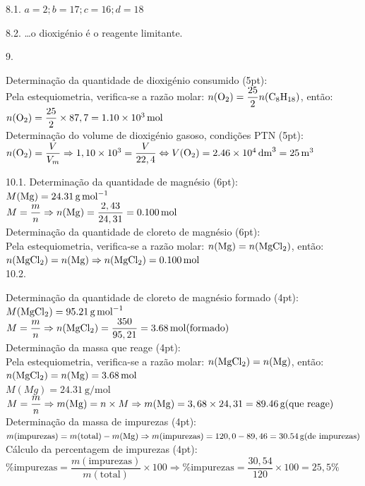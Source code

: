 \documentclass{article}
\begin{document}
\vspace{20pt}
8.1. $a = 2; b = 17; c = 16; d = 18$ 

\vspace{20pt}
8.2. \ldots o dioxigénio é o reagente limitante.

\vspace{20pt}
9.

			Determinação da quantidade de dioxigénio consumido (5pt):\\
			Pela estequiometria, verifica-se a razão molar: $n(\ce{O2}) = \dfrac{25}{2} n(\ce{C8H18})$, então:\\
			$n(\ce{O2}) = \dfrac{25}{2} \times 87,7 = \SI{1,10e3}{\mole}$\\[8pt]
			Determinação do volume de dioxigénio gasoso, condições PTN (5pt):\\
			$n(\ce{O2}) = \dfrac{V}{V_m} \Rightarrow 1,10 \times 10^3 = \dfrac{V}{22,4} \Leftrightarrow V(\ce{O2}) = \SI{2,46e4}{\cubic\deci\meter} = \SI{25}{\cubic\meter}$


\vspace{20pt}
10.1.
				Determinação da quantidade de magnésio (6pt):\\
				$M(\ce{Mg})=\SI{24,31}{\gram\per\mole}$ \\
				$M=\dfrac{m}{n} \Rightarrow n(\ce{Mg})=\dfrac{2,43}{24,31} =\SI{0,100}{\mole}$ \\[8pt]
				Determinação da quantidade de cloreto de magnésio (6pt):\\
				Pela estequiometria, verifica-se a razão molar: $n(\ce{Mg}) = n(\ce{MgCl2})$, então:\\
				$n(\ce{MgCl2})=n(\ce{Mg})\Rightarrow n(\ce{MgCl2})=\SI{0,100}{\mole}$\\

\vspace{20pt}
10.2.

				Determinação da quantidade de cloreto de magnésio formado (4pt):\\
				$M(\ce{MgCl2})=\SI{95,21}{\gram\per\mole}$\\
				$M=\dfrac{m}{n} \Rightarrow n(\ce{MgCl2})=\dfrac{350}{95,21} =\SI{3,68}{\mole} (\text{formado})$\\[8pt]
				Determinação da massa que reage (4pt):\\
				Pela estequiometria, verifica-se a razão molar: $n(\ce{MgCl2}) = n(\ce{Mg})$, então:
				$n(\ce{MgCl2}) = n(\ce{Mg}) = \SI{3,68}{\mole}$\\
				$M(Mg)=\SI{24,31}{\gram\per\mole}$\\ 
				$M=\dfrac{m}{n} \Rightarrow m(\ce{Mg})= n \times M \Rightarrow m(\ce{Mg}) = 3,68 \times 24,31 = \SI{89,46}{\gram} (\text{que reage})$\\[8pt]
				Determinação da massa de impurezas (4pt):\\
				$m(\text{impurezas})= m(\text{total})- m(\ce{Mg}) \Rightarrow m(\text{impurezas}) = 120,0 - 89,46 = \SI{30,54}{\gram} (\text{de impurezas}) $\\[8pt]
				Cálculo da percentagem de impurezas (4pt):\\
				$\% \text{impurezas} = \dfrac{m(\text{impurezas})}{m(\text{total})} \times 100 \Rightarrow \% \text{impurezas}=\dfrac{30,54}{120} \times 100 = 25,5 \% $
\end{document}
